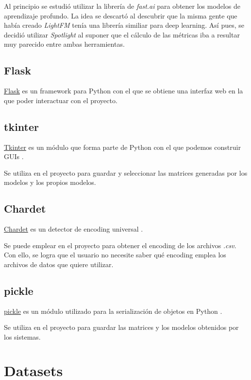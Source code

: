 Al principio se estudió utilizar la librería de \textit{fast.ai} para obtener los modelos de aprendizaje profundo. La idea se descartó al descubrir que la misma gente que había creado \textit{LightFM} tenía una librería similiar para deep learning. Así pues, se decidió utilizar \textit{Spotlight} al suponer que el cálculo de las métricas iba a resultar muy parecido entre ambas herramientas.

\subsection{Flask}\label{flask}
\href{http://flask.pocoo.org/}{Flask} es un framework para Python con el que se obtiene una interfaz web en la que poder interactuar con el proyecto.

\subsection{tkinter}\label{tkinter}
\href{https://docs.python.org/3/library/tk.html}{Tkinter} es un módulo que forma parte de Python con el que podemos construir GUIs \cite{tkinter}.

Se utiliza en el proyecto para guardar y seleccionar las matrices generadas por los modelos y los propios modelos.

\subsection{Chardet}\label{chardet}
\href{https://pypi.org/project/chardet/}{Chardet} es un detector de encoding universal \cite{chardet}.

Se puede emplear en el proyecto para obtener el encoding de los archivos \textit{.csv}. Con ello, se logra que el usuario no necesite saber qué encoding emplea los archivos de datos que quiere utilizar.

\subsection{pickle}\label{pickle}
\href{https://docs.python.org/3/library/pickle.html}{pickle} es un módulo utilizado para la serialización de objetos en Python \cite{pickle}.

Se utiliza en el proyecto para guardar las matrices y los modelos obtenidos por los sistemas.

\section{Datasets}\label{datasets}
